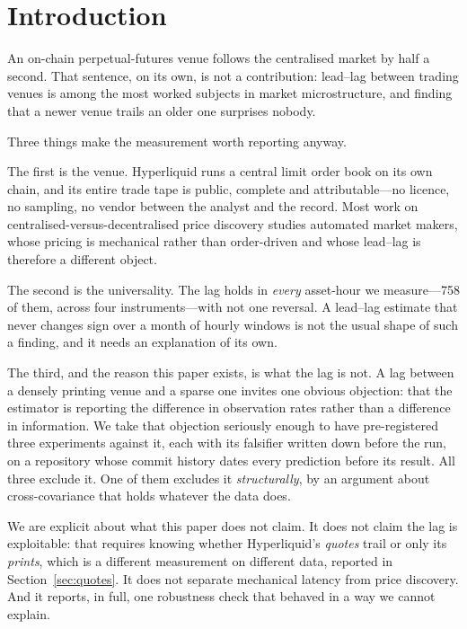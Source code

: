 \documentclass[11pt,a4paper]{article}
\begin{document}
\section{Introduction}

An on-chain perpetual-futures venue follows the centralised market by half a second. That
sentence, on its own, is not a contribution: lead--lag between trading venues is among the most
worked subjects in market microstructure, and finding that a newer venue trails an older one
surprises nobody.

Three things make the measurement worth reporting anyway.

The first is the venue. Hyperliquid runs a central limit order book on its own chain, and its
entire trade tape is public, complete and attributable---no licence, no sampling, no vendor
between the analyst and the record. Most work on centralised-versus-decentralised price discovery
studies automated market makers, whose pricing is mechanical rather than order-driven and whose
lead--lag is therefore a different object.

The second is the universality. The lag holds in \emph{every} asset-hour we measure---758 of
them, across four instruments---with not one reversal. A lead--lag estimate that never changes
sign over a month of hourly windows is not the usual shape of such a finding, and it needs an
explanation of its own.

The third, and the reason this paper exists, is what the lag is not. A lag between a densely
printing venue and a sparse one invites one obvious objection: that the estimator is reporting
the difference in observation rates rather than a difference in information. We take that
objection seriously enough to have pre-registered three experiments against it, each with its
falsifier written down before the run, on a repository whose commit history dates every
prediction before its result. All three exclude it. One of them excludes it \emph{structurally},
by an argument about cross-covariance that holds whatever the data does.

We are explicit about what this paper does not claim. It does not claim the lag is exploitable:
that requires knowing whether Hyperliquid's \emph{quotes} trail or only its \emph{prints}, which
is a different measurement on different data, reported in Section~\ref{sec:quotes}. It does not
separate mechanical latency from price discovery. And it reports, in full, one robustness check
that behaved in a way we cannot explain.
\end{document}

